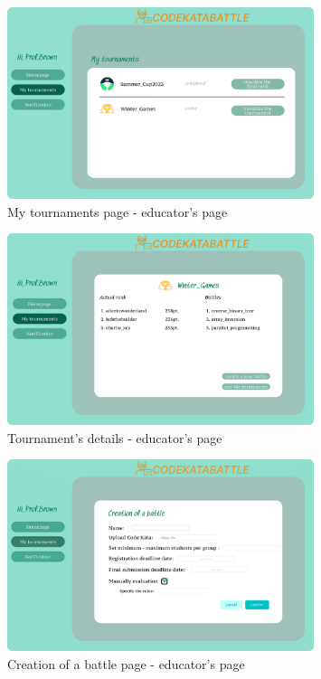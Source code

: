 \begin{figure}[H]
    \centering
    \includegraphics[width=0.8\textwidth]{images/user_interface/UI_sw2-12.png}
    \caption{My tournaments page - educator's page}
\end{figure}

\begin{figure}[H]
    \centering
    \includegraphics[width=0.8\textwidth]{images/user_interface/UI_sw2-13.png}
    \caption{Tournament's details - educator's page}
\end{figure}

\begin{figure}[H]
    \centering
    \includegraphics[width=0.8\textwidth]{images/user_interface/UI_sw2-14.png}
    \caption{Creation of a battle page - educator's page}
\end{figure}

